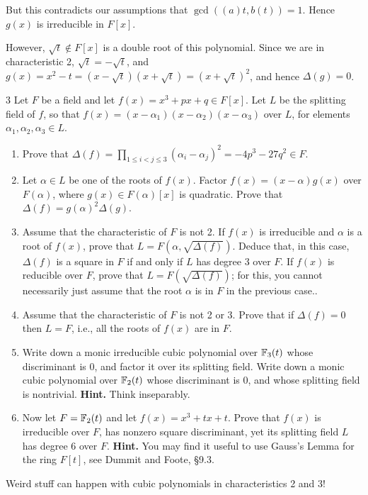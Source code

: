 \documentclass[12pt]{article}
\begin{document}
\begin{solution}
\begin{enumerate}
        But this contradicts our assumptions that $\gcd((a)t, b(t)) =1$. Hence $g(x)$ is irreducible in $F[x]$. 

        However, $\sqrt{t} \notin F[x]$ is a double root of this polynomial. Since we are in characteristic 2, $\sqrt{t} = -\sqrt{t}$, and $g(x) = x^2 - t = (x-\sqrt{t})(x+\sqrt{t}) = (x + \sqrt{t})^2$, and hence $\Delta(g) = 0$. 
    \end{enumerate}
\end{solution}

\newpage 

\begin{problem}{3}
Let $F$ be a field and let $f(x) = x^3+px+q \in F[x]$.  Let $L$ be the
splitting field of $f$, so that $f(x) =
(x-\alpha_1)(x-\alpha_2)(x-\alpha_3)$ over $L$, for elements
$\alpha_1,\alpha_2,\alpha_3 \in L$.
\begin{enumerate}\renewcommand{\itemsep}{3mm}
\item Prove that $\Delta(f) = \prod_{1 \leq i < j \leq 3} (\alpha_i-\alpha_j)^2 =
-4p^3 - 27q^2 \in F$. 

\item Let $\alpha \in L$ be one of the roots of $f(x)$.  Factor $f(x) = (x-\alpha)g(x)$ over $F(\alpha)$, where $g(x) \in F(\alpha)[x]$ is quadratic.  Prove that $\Delta(f) =
g(\alpha)^2\Delta(g)$.

\item Assume that the characteristic of $F$ is not 2.  If $f(x)$ is
irreducible and $\alpha$ is a root of $f(x)$, prove that $L =
F(\alpha,\sqrt{\Delta(f)})$.  Deduce that, in this case, $\Delta(f)$
is a square in $F$ if and only if $L$ has degree 3 over $F$.  If
$f(x)$ is reducible over $F$, prove that $L =
F(\sqrt{\Delta(f)})$; for this, you cannot necessarily just assume
that the root $\alpha$ is in $F$ in the previous case..

\item Assume that the characteristic of $F$ is not 2 or 3.  Prove that
if $\Delta(f)=0$ then $L=F$, i.e., all the roots of $f(x)$ are in $F$.

\item Write down a monic irreducible cubic polynomial over $\mathbb F_3(t)$
whose discriminant is 0, and factor it over its splitting field.
Write down a monic cubic polynomial over $\mathbb F_2(t)$ whose discriminant
is 0, and whose splitting field is nontrivial. 
\textbf{Hint.} Think inseparably.

\item Now let $F=\mathbb F_2(t)$ and let $f(x) = x^3+tx+t$.  Prove that
$f(x)$ is irreducible over $F$, has nonzero square discriminant, yet
its splitting field $L$ has degree 6 over $F$. \textbf{Hint.} You
may find it useful to use Gauss's Lemma for the ring $F[t]$, see
Dummit and Foote, \S9.3.

\end{enumerate}
Weird stuff can happen with cubic polynomials in characteristics 2 and 3!
\end{problem}
\end{document}
